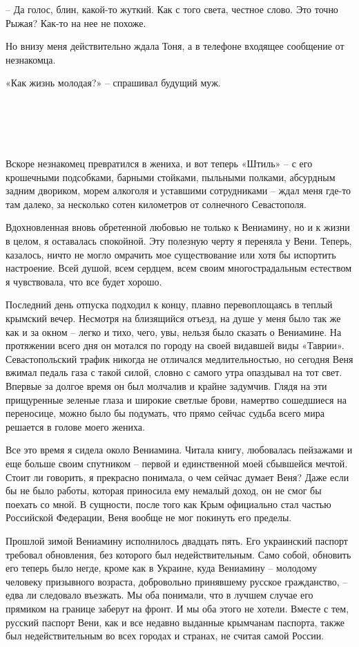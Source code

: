 \documentclass[
]{book}
\begin{document}
-- Да голос, блин, какой-то жуткий. Как с того света, честное слово. Это точно Рыжая? Как-то на нее не похоже.

Но внизу меня действительно ждала Тоня, а в телефоне входящее сообщение от незнакомца.

«Как жизнь молодая?» -- спрашивал будущий муж.

\hypertarget{chapter-33}{%
\chapter{~}\label{chapter-33}}

Вскоре незнакомец превратился в жениха, и вот теперь «Штиль» -- с его крошечными подсобками, барными стойками, пыльными полками, абсурдным задним двориком, морем алкоголя и уставшими сотрудниками -- ждал меня где-то там далеко, за несколько сотен километров от солнечного Севастополя.

Вдохновленная вновь обретенной любовью не только к Вениамину, но и к жизни в целом, я оставалась спокойной. Эту полезную черту я переняла у Вени. Теперь, казалось, ничто не могло омрачить мое существование или хотя бы испортить настроение. Всей душой, всем сердцем, всем своим многострадальным естеством я чувствовала, что все будет хорошо.

Последний день отпуска подходил к концу, плавно перевоплощаясь в теплый крымский вечер. Несмотря на близящийся отъезд, на душе у меня было так же как и за окном -- легко и тихо, чего, увы, нельзя было сказать о Вениамине. На протяжении всего дня он мотался по городу на своей видавшей виды «Таврии». Севастопольский трафик никогда не отличался медлительностью, но сегодня Веня вжимал педаль газа с такой силой, словно с самого утра опаздывал на тот свет. Впервые за долгое время он был молчалив и крайне задумчив. Глядя на эти прищуренные зеленые глаза и широкие светлые брови, намертво сошедшиеся на переносице, можно было бы подумать, что прямо сейчас судьба всего мира решается в голове моего жениха.

Все это время я сидела около Вениамина. Читала книгу, любовалась пейзажами и еще больше своим спутником -- первой и единственной моей сбывшейся мечтой. Стоит ли говорить, я прекрасно понимала, о чем сейчас думает Веня? Даже если бы не было работы, которая приносила ему немалый доход, он не смог бы поехать со мной. В сущности, после того как Крым официально стал частью Российской Федерации, Веня вообще не мог покинуть его пределы.

Прошлой зимой Вениамину исполнилось двадцать пять. Его украинский паспорт требовал обновления, без которого был недействительным. Само собой, обновить его теперь было негде, кроме как в Украине, куда Вениамину -- молодому человеку призывного возраста, добровольно принявшему русское гражданство, -- едва ли следовало въезжать. Мы оба понимали, что в лучшем случае его прямиком на границе заберут на фронт. И мы оба этого не хотели. Вместе с тем, русский паспорт Вени, как и все недавно выданные крымчанам паспорта, также был недействительным во всех городах и странах, не считая самой России.
\end{document}
